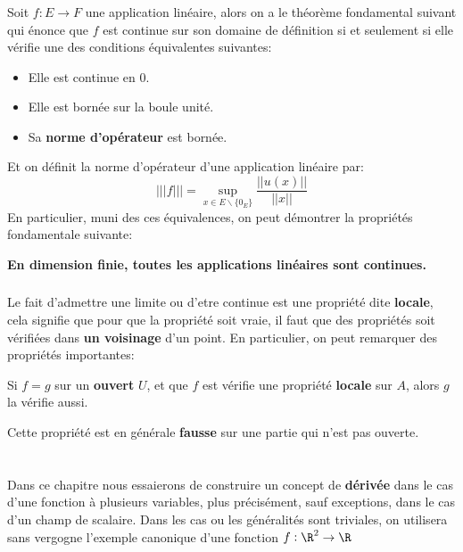 \subsection*{}
Soit \(f : E \rightarrow F\) une application linéaire, alors on a le théorème fondamental suivant qui énonce que \(f\) est continue sur son domaine de définition si et seulement si elle vérifie une des conditions équivalentes suivantes:
\begin{itemize}
   \item Elle est continue en 0.
   \item Elle est bornée sur la boule unité.
   \item Sa \textbf{norme d'opérateur} est bornée.
\end{itemize}
Et on définit la norme d'opérateur d'une application linéaire par:
\[
   |||f||| = \underset{x \in E \backslash \{0_E\}}{\sup}{\frac{||u(x)||}{||x||}}   
\]
En particulier, muni des ces équivalences, on peut démontrer la propriétés fondamentale suivante:
\begin{center}
   \textbf{En dimension finie, toutes les applications linéaires sont continues.}
\end{center}

\subsection*{}
Le fait d'admettre une limite ou d'etre continue est une propriété dite \textbf{locale}, cela signifie que pour que la propriété soit vraie, il faut que des propriétés soit vérifiées dans \textbf{un voisinage} d'un point. En particulier, on peut remarquer des propriétés importantes:
\begin{center}
   Si \(f = g\) sur un \textbf{ouvert} \(U\), et que \(f\) est vérifie une propriété \textbf{locale} sur \(A\), alors \(g\) la vérifie aussi.
\end{center}
Cette propriété est en générale \textbf{fausse} sur une partie qui n'est pas ouverte.

\chapter*{}
Dans ce chapitre nous essaierons de construire un concept de \textbf{dérivée} dans le cas d'une fonction à plusieurs variables, plus précisément, sauf exceptions, dans le cas d'un champ de scalaire. Dans les cas ou les généralités sont triviales, on utilisera sans vergogne l'exemple canonique d'une fonction \(f : \R^2 \rightarrow \R\)

